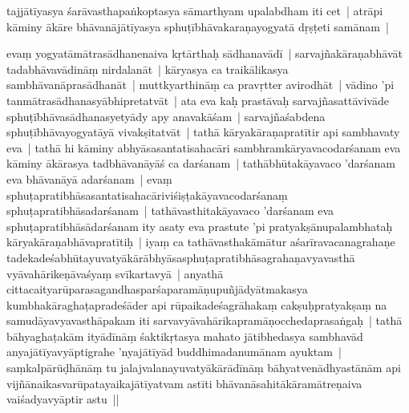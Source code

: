 \documentclass[article,12pt,a4paper]{memoir}%
\newcounter{parCount}
\begin{document}
	  \pstart \leavevmode%
	\label{thakur75-5.10}tajjātīyasya śarāvasthapaṅkoptasya sāmarthyam upalabdham iti cet | atrāpi kāminy ākāre bhāvanājātīyasya sphuṭībhāvakaraṇayogyatā dṛṣṭeti samānam | 
	{}
	\pend%
      

	  \pstart \leavevmode%
	\label{thakur75-5.12}evaṃ yogyatāmātrasādhanenaiva kṛtārthaḥ sādhanavādī | sarvajñakāraṇabhāvāt tadabhāvavādināṃ nirdalanāt | kāryasya ca traikālikasya sambhāvanāprasādhanāt | muttkyarthināṃ ca pravṛtter avirodhāt | vādino 'pi tanmātrasādhanasyābhipretatvāt | ata eva kaḥ prastāvaḥ sarvajñasattāvivāde sphuṭībhāvasādhanasyetyādy apy anavakāśam | sarvajñaśabdena sphuṭībhāvayogyatāyā vivakṣitatvāt | tathā kāryakāraṇapratītir api sambhavaty eva | tathā hi kāminy abhyāsasantatisahacāri sambhramkāryavacodarśanam eva kāminy ākārasya tadbhāvanāyāś ca darśanam | tathābhūtakāyavaco 'darśanam eva bhāvanāyā adarśanam | evaṃ sphuṭapratibhāsasantatisahacāriviśiṣṭakāyavacodarśanaṃ sphuṭapratibhāsadarśanam | tathāvasthitakāyavaco 'darśanam eva sphuṭapratibhāsādarśanam ity asaty eva prastute 'pi pratyakṣānupalambhataḥ kāryakāraṇabhāvapratītiḥ | iyaṃ ca tathāvasthakāmātur aśarīravacanagrahaṇe tadekadeśabhūtayuvatyākārābhyāsasphuṭapratibhāsagrahaṇavyavasthā vyāvahārikeṇāvaśyaṃ svīkartavyā | anyathā \label{ratnakīrtinibandhāvali__36r1PF7IMWYWBFZSMXH00ZADHKO}citta\label{ratnakīrtinibandhāvali__36r1PF7IMWYNUC1RBB38NANZLQM}caityarūparasagandhasparśaparamāṇupuñjādyātmakasya kumbhakāraghaṭapradeśāder api rūpaikadeśagrāhakaṃ cakṣuḥpratyakṣaṃ na samudāyavyavasthāpakam iti sarvavyāvahārikapramāṇocchedaprasaṅgaḥ | tathā bāhyaghaṭakām ityādīnāṃ śaktikṛtasya mahato jātibhedasya sambhavād anyajātīyavyāptigrahe 'nyajātīyād buddhimadanumānam ayuktam | saṃkalpārūḍhānāṃ tu jalajvalanayuvatyākārādīnāṃ bāhyatvenādhyastānām api vijñānaikasvarūpatayaikajātīyatvam astīti bhāvanāsahitākāramātreṇaiva vaiśadyavyāptir astu ||
	{}
	\pend%
      
\end{document}
